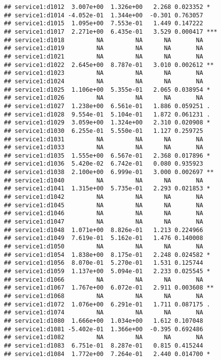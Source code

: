 \documentclass[
]{article}
\begin{document}
\begin{verbatim}
## service1:d1012  3.007e+00  1.326e+00   2.268 0.023352 *  
## service1:d1014 -4.052e-01  1.344e+00  -0.301 0.763057    
## service1:d1015  1.095e+00  7.553e-01   1.449 0.147222    
## service1:d1017  2.271e+00  6.435e-01   3.529 0.000417 ***
## service1:d1018         NA         NA      NA       NA    
## service1:d1019         NA         NA      NA       NA    
## service1:d1021         NA         NA      NA       NA    
## service1:d1022  2.645e+00  8.787e-01   3.010 0.002612 ** 
## service1:d1023         NA         NA      NA       NA    
## service1:d1024         NA         NA      NA       NA    
## service1:d1025  1.106e+00  5.355e-01   2.065 0.038954 *  
## service1:d1026         NA         NA      NA       NA    
## service1:d1027  1.238e+00  6.561e-01   1.886 0.059251 .  
## service1:d1028  9.554e-01  5.104e-01   1.872 0.061231 .  
## service1:d1029  3.059e+00  1.324e+00   2.310 0.020908 *  
## service1:d1030  6.255e-01  5.550e-01   1.127 0.259725    
## service1:d1031         NA         NA      NA       NA    
## service1:d1033         NA         NA      NA       NA    
## service1:d1035  1.555e+00  6.567e-01   2.368 0.017896 *  
## service1:d1036  5.420e-02  6.742e-01   0.080 0.935923    
## service1:d1038  2.100e+00  6.999e-01   3.000 0.002697 ** 
## service1:d1040         NA         NA      NA       NA    
## service1:d1041  1.315e+00  5.735e-01   2.293 0.021853 *  
## service1:d1042         NA         NA      NA       NA    
## service1:d1045         NA         NA      NA       NA    
## service1:d1046         NA         NA      NA       NA    
## service1:d1047         NA         NA      NA       NA    
## service1:d1048  1.071e+00  8.826e-01   1.213 0.224966    
## service1:d1049  7.619e-01  5.162e-01   1.476 0.140008    
## service1:d1050         NA         NA      NA       NA    
## service1:d1054  1.838e+00  8.175e-01   2.248 0.024582 *  
## service1:d1056  8.070e-01  5.270e-01   1.531 0.125744    
## service1:d1059  1.137e+00  5.094e-01   2.233 0.025545 *  
## service1:d1066         NA         NA      NA       NA    
## service1:d1067  1.767e+00  6.072e-01   2.911 0.003608 ** 
## service1:d1068         NA         NA      NA       NA    
## service1:d1072  1.076e+00  6.291e-01   1.711 0.087175 .  
## service1:d1074         NA         NA      NA       NA    
## service1:d1080  1.666e+00  1.034e+00   1.612 0.107048    
## service1:d1081 -5.402e-01  1.366e+00  -0.395 0.692486    
## service1:d1082         NA         NA      NA       NA    
## service1:d1083  6.751e-01  8.287e-01   0.815 0.415244    
## service1:d1084  1.772e+00  7.264e-01   2.440 0.014700 *  

\end{verbatim}
\end{document}
